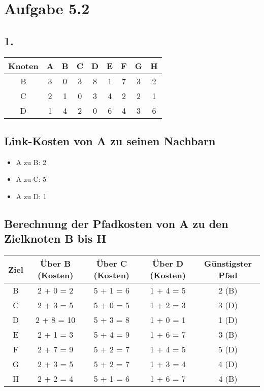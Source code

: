 \documentclass[a4paper]{scrartcl}
\begin{document}
\section*{Aufgabe 5.2}
\subsection*{1.}
\begin{tabular}{|c|c|c|c|c|c|c|c|c|}
\hline
Knoten & A & B & C & D & E & F & G & H \\
\hline
B & 3 & 0 & 3 & 8 & 1 & 7 & 3 & 2 \\
\hline
C & 2 & 1 & 0 & 3 & 4 & 2 & 2 & 1 \\
\hline
D & 1 & 4 & 2 & 0 & 6 & 4 & 3 & 6 \\
\hline
\end{tabular}

\subsection*{Link-Kosten von A zu seinen Nachbarn}

\begin{itemize}
    \item A zu B: 2
    \item A zu C: 5
    \item A zu D: 1
\end{itemize}

\subsection*{Berechnung der Pfadkosten von A zu den Zielknoten B bis H}

\begin{tabular}{|c|c|c|c|c|}
\hline
Ziel & Über B (Kosten) & Über C (Kosten) & Über D (Kosten) & Günstigster Pfad \\
\hline
B & 2 + 0 = 2 & 5 + 1 = 6 & 1 + 4 = 5 & 2 (B) \\
\hline
C & 2 + 3 = 5 & 5 + 0 = 5 & 1 + 2 = 3 & 3 (D) \\
\hline
D & 2 + 8 = 10 & 5 + 3 = 8 & 1 + 0 = 1 & 1 (D) \\
\hline
E & 2 + 1 = 3 & 5 + 4 = 9 & 1 + 6 = 7 & 3 (B) \\
\hline
F & 2 + 7 = 9 & 5 + 2 = 7 & 1 + 4 = 5 & 5 (D) \\
\hline
G & 2 + 3 = 5 & 5 + 2 = 7 & 1 + 3 = 4 & 4 (D) \\
\hline
H & 2 + 2 = 4 & 5 + 1 = 6 & 1 + 6 = 7 & 4 (B) \\
\hline
\end{tabular}
\end{document}
